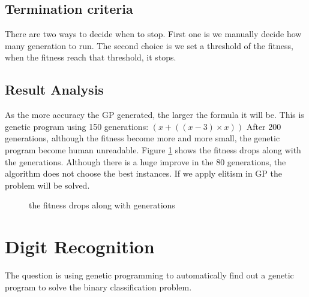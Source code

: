 \documentclass[11pt, a4paper, oneside, openright]{article}
\begin{document}
\subsection{Termination criteria}
There are two ways to decide when to stop.
First one is we manually decide how many generation to run. The second choice is we set a threshold of the fitness, when the fitness reach that threshold, it stops.

\subsection{Result Analysis}
As the more accuracy the GP generated, the larger the formula it will be. 
This is genetic program using 150 generations:
\newline \hspace * {5cm} $(x + ((x - 3) \times x))$
\newline After 200 generations, although the fitness become more and more small, the genetic program become human unreadable. Figure \ref{fig:generations} shows the fitness drops along with the generations. Although there is a huge improve 
in the 80 generations, the algorithm does not choose the best instances. If we apply elitism in GP the problem will be solved.
  \begin{figure}[!ht]
  \centerline{}
  \caption{ the fitness drops along with generations}
  \label{fig:generations}
  \end{figure}
 

\section{Digit Recognition}
The  question is using genetic programming to automatically find out a genetic program to solve the binary classification problem.
\end{document}
